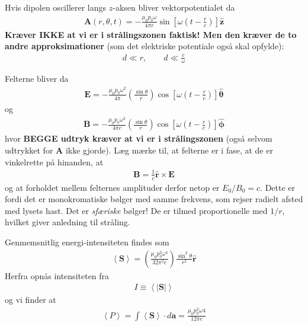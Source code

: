 \documentclass[a4paper]{article}
\begin{document}
    Hvis dipolen oscillerer langs \(z\)-aksen bliver vektorpotentialet da 
    \begin{align*}
        \boxed{\mathbf{A}(r, \theta, t) = - \frac{\mu _0 p_0 \omega }{4 \pi  r} \sin \left[ \omega (t - \frac{r}{c}) \right] \hat{\mathbf{z}}} \tag{11.17}
    \end{align*}
    \textbf{Kræver IKKE at vi er i strålingszonen faktisk! Men den kræver de to andre approksimationer} (som det elektriske potentiale også skal opfylde): \begin{align*}
        d\ll r, \qquad d \ll \frac{c}{\omega } \tag{11.7+10}
    \end{align*} 

    Felterne bliver da \begin{align*}
        \boxed{\mathbf{E} = -\frac{\mu _0 p_0 \omega ^{2} }{4 \pi } \left( \frac{\sin  \theta }{r} \right) \cos \left[ \omega (t - \frac{r}{c}) \right] \hat{\boldsymbol{\theta}}} \tag{11.18}
    \end{align*}
    og
    \begin{align*}
        \boxed{\mathbf{B} = -\frac{\mu _0 p_0 \omega ^{2} }{4 \pi c} \left( \frac{\sin  \theta }{r} \right) \cos \left[ \omega (t - \frac{r}{c}) \right] \hat{\boldsymbol{\phi }}} \tag{11.19}
    \end{align*}
    hvor \textbf{BEGGE udtryk kræver at vi er i strålingszonen} (også selvom udtrykket for \(\mathbf{A}\) ikke gjorde). Læg mærke til, at felterne er i fase, at de er vinkelrette på hinanden, at \begin{align*}
        \mathbf{B} = \frac{1}{c} \hat{\mathbf{r}} \times \mathbf{E}
    \end{align*} og at forholdet mellem felternes amplituder derfor netop er \(E_0 /B_0 = c\). Dette er fordi det er monokromatiske bølger med samme frekvens, som rejser radielt afsted med lysets hast. Det er \textit{sfæriske} bølger! De er tilmed proportionelle med \(1 / r\), hvilket giver anledning til stråling. 
    
    Genmemsnitlig energi-intensiteten findes som \begin{align*}
        \left\langle \mathbf{S} \right\rangle = \left( \frac{\mu _0 p_0 ^2 \omega ^4}{32 \pi^{2} c} \right) \frac{\sin ^{2} \theta }{r^{2} } \hat{\mathbf{r}} \tag{11.21}
    \end{align*}
    Herfra opnås intensiteten fra \begin{align*}
        I \equiv \left\langle |\mathbf{S}| \right\rangle 
    \end{align*}
    og vi finder at  \begin{align*}
        \left\langle P \right\rangle = \int \left\langle \mathbf{S} \right\rangle \cdot d \mathbf{a} = \frac{\mu _0 p_0 ^{2} \omega 
        4}{12 \pi  c} \tag{11.22}
    \end{align*}
\end{document}
